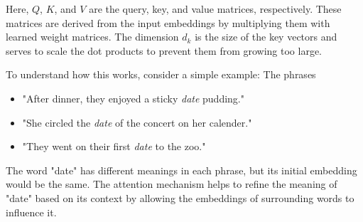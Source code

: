                 Here, \(Q\), \(K\), and \(V\) are the query, key, and value matrices, respectively. These matrices are derived from the input embeddings by multiplying them with learned weight matrices. The dimension \(d_k\) is the size of the key vectors and serves to scale the dot products to prevent them from growing too large.

                To understand how this works, consider a simple example: The phrases
                \begin{itemize}
                    \item "After dinner, they enjoyed a sticky \emph{date} pudding."
                    \item "She circled the \emph{date} of the concert on her calender."
                    \item "They went on their first \emph{date} to the zoo."
                \end{itemize}
                The word "date" has different meanings in each phrase, but its initial embedding would be the same. The attention mechanism helps to refine the meaning of "date" based on its context by allowing the embeddings of surrounding words to influence it.

